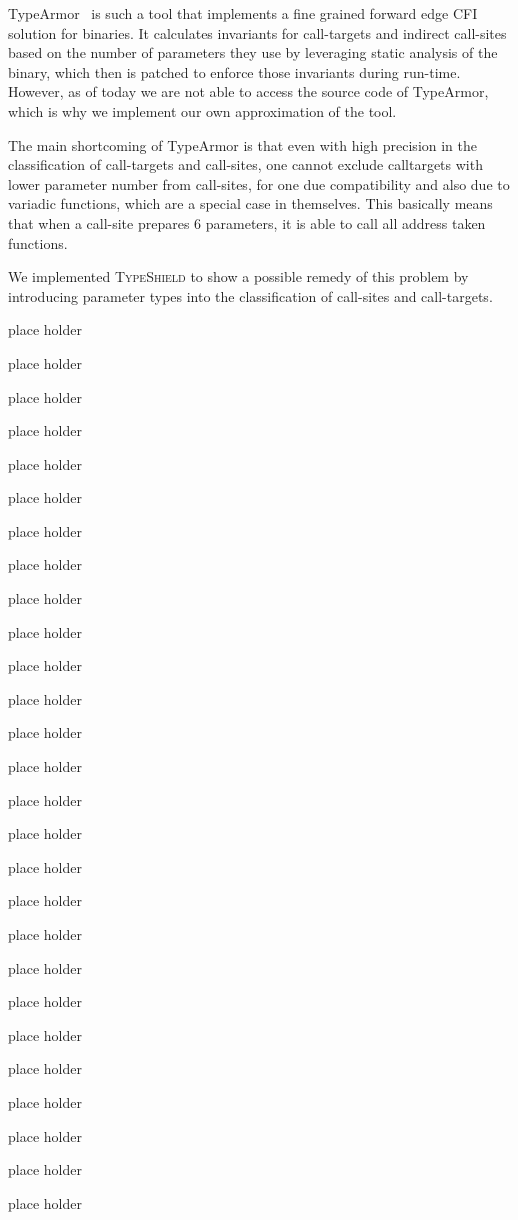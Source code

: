 TypeArmor~\cite{veen:typearmor} is such a tool that implements a fine grained forward edge CFI 
solution for binaries. It calculates invariants for call-targets and indirect call-sites based on
the number of parameters they use by leveraging static analysis of the binary, which then is
patched to enforce those invariants during run-time. However, as of today we are not able to 
access the source code of TypeArmor, which is why we implement our own approximation of the 
tool.

The main shortcoming of TypeArmor is that even with high precision in the classification of 
call-targets and call-sites, one cannot exclude calltargets with lower parameter number from 
call-sites, for one due compatibility and also due to variadic functions, which are a special
case in themselves. This basically means that when a call-site prepares 6 parameters, it is 
able to call all address taken functions.

We implemented \textsc{TypeShield} to show a possible remedy of this problem by introducing
parameter types into the classification of call-sites and call-targets. 

place holder

place holder

place holder

place holder

place holder

place holder

place holder

place holder

place holder

place holder

place holder

place holder

place holder

place holder

place holder

place holder

place holder

place holder

place holder

place holder

place holder

place holder

place holder

place holder

place holder

place holder

place holder

